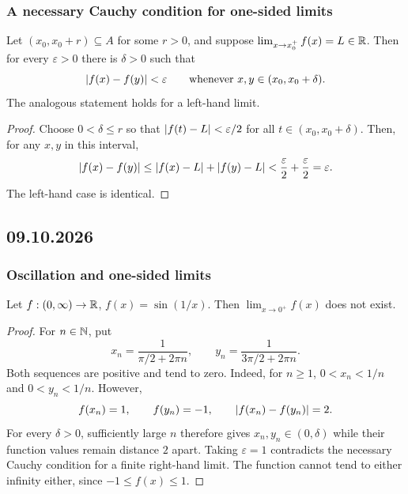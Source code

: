 \documentclass[11pt,a4paper]{amsart}
\begin{document}
\subsubsection{A necessary Cauchy condition for one-sided limits}

\begin{theorem}
  Let \((x_0,x_0+r)\subseteq A\) for some \(r>0\), and suppose
  \(\lim_{x\to x_0^+}f(x)=L\in\mathbb{R}\). Then for every
  \(\varepsilon>0\) there is \(\delta>0\) such that
  \[
    \lvert f(x)-f(y)\rvert<\varepsilon
    \qquad\text{whenever }x,y\in(x_0,x_0+\delta).
  \]
  The analogous statement holds for a left-hand limit.
\end{theorem}

\begin{proof}
  Choose \(0<\delta\leq r\) so that
  \(\lvert f(t)-L\rvert<\varepsilon/2\) for all
  \(t\in(x_0,x_0+\delta)\). Then, for any \(x,y\) in this interval,
  \[
    \lvert f(x)-f(y)\rvert
    \leq\lvert f(x)-L\rvert+\lvert f(y)-L\rvert
    <\frac\varepsilon2+\frac\varepsilon2=\varepsilon.
  \]
  The left-hand case is identical.
\end{proof}

\subsection{09.10.2026}

\subsubsection{Oscillation and one-sided limits}

\begin{example}
  Let \(f:(0,\infty)\to\mathbb{R}\), \(f(x)=\sin(1/x)\). Then
  \(\lim_{x\to0^+}f(x)\) does not exist.
\end{example}

\begin{proof}
  For \(n\in\mathbb{N}\), put
  \[
    x_n=\frac1{\pi/2+2\pi n},
    \qquad y_n=\frac1{3\pi/2+2\pi n}.
  \]
  Both sequences are positive and tend to zero. Indeed, for \(n\geq1\),
  \(0<x_n<1/n\) and \(0<y_n<1/n\). However,
  \[
    f(x_n)=1,\qquad f(y_n)=-1,
    \qquad \lvert f(x_n)-f(y_n)\rvert=2.
  \]
  For every \(\delta>0\), sufficiently large \(n\) therefore gives
  \(x_n,y_n\in(0,\delta)\) while their function values remain distance
  \(2\) apart. Taking \(\varepsilon=1\) contradicts the necessary
  Cauchy condition for a finite right-hand limit. The function cannot
  tend to either infinity either, since \(-1\leq f(x)\leq1\).
\end{proof}
\end{document}
